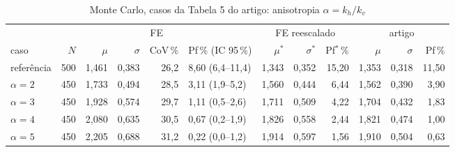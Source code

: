 \documentclass[11pt,a4paper]{article}
\begin{document}
\begin{table}[H]\centering\footnotesize\setlength{\tabcolsep}{3.2pt}\caption{Monte Carlo, casos da Tabela 5 do artigo: anisotropia $\alpha = k_h/k_v$}\label{tab:mc5}
\begin{tabular}{lrrrrlrrr>{\color{art}}r>{\color{art}}r>{\color{art}}r}\toprule & \multicolumn{5}{c}{FE} & \multicolumn{3}{c}{FE reescalado} & \multicolumn{3}{c}{\color{art}artigo}\\\cmidrule(lr){2-6}\cmidrule(lr){7-9}\cmidrule(l){10-12}caso & $N$ & $\mu$ & $\sigma$ & CoV\,\% & Pf\,\% (IC 95\,\%) & $\mu^*$ & $\sigma^*$ & Pf$^*$\,\% & $\mu$ & $\sigma$ & Pf\,\%\\\midrule
referência & 500 & 1{,}461 & 0{,}383 & 26{,}2 & 8{,}60 (6{,}4--11{,}4) & 1{,}343 & 0{,}352 & 15{,}20 & 1{,}353 & 0{,}318 & 11{,}50\\
$\alpha = 2$ & 450 & 1{,}733 & 0{,}494 & 28{,}5 & 3{,}11 (1{,}9--5{,}2) & 1{,}560 & 0{,}444 & 6{,}44 & 1{,}562 & 0{,}390 & 3{,}90\\
$\alpha = 3$ & 450 & 1{,}928 & 0{,}574 & 29{,}7 & 1{,}11 (0{,}5--2{,}6) & 1{,}711 & 0{,}509 & 4{,}22 & 1{,}704 & 0{,}432 & 1{,}83\\
$\alpha = 4$ & 450 & 2{,}080 & 0{,}635 & 30{,}5 & 0{,}67 (0{,}2--1{,}9) & 1{,}826 & 0{,}558 & 2{,}44 & 1{,}821 & 0{,}474 & 1{,}00\\
$\alpha = 5$ & 450 & 2{,}205 & 0{,}688 & 31{,}2 & 0{,}22 (0{,}0--1{,}2) & 1{,}914 & 0{,}597 & 1{,}56 & 1{,}910 & 0{,}504 & 0{,}63\\
\bottomrule\end{tabular}
\end{table}
\end{document}

